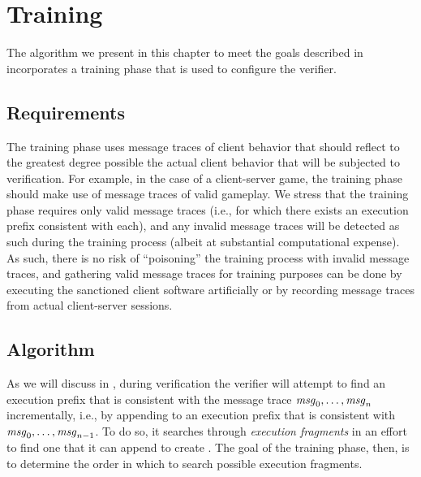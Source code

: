 \section{Training}
\label{sec:guided:training}

The algorithm we present in this chapter to meet the goals described in
 incorporates a training phase that is used to
configure the verifier.

\subsection{Requirements}
\label{sec:guided:training:requirements}

The training phase uses message traces of client behavior that should
reflect to the greatest degree possible the actual client behavior
that will be subjected to verification. For example, in the case of a
client-server game, the training phase should make use of message
traces of valid gameplay.  We stress that the training phase requires
only valid message traces (i.e., for which there exists an execution
prefix consistent with each), and any invalid message traces will be
detected as such during the training process (albeit at substantial
computational expense).  As such, there is no risk of ``poisoning''
the training process with invalid message traces, and gathering valid
message traces for training purposes can be done by executing the
sanctioned client software artificially or by recording message traces
from actual client-server sessions.

\subsection{Algorithm}
\label{sec:guided:training:algorithm}

As we will discuss in , during verification
the verifier will attempt to find an execution prefix
\execPrefix{\msgNmbr} that is consistent with the message trace
$\mathit{msg}_{0}, \ldots, \mathit{msg}_{n}$ incrementally, i.e., by appending to
an execution prefix  that is consistent with
$\mathit{msg}_{0}, \ldots, \mathit{msg}_{n-1}$.  To do so, it searches through
\textit{execution fragments} in an effort to find one that it can
append to create \execPrefix{\msgNmbr}.  The goal of the training
phase, then, is to determine the order in which to search possible
execution fragments.

